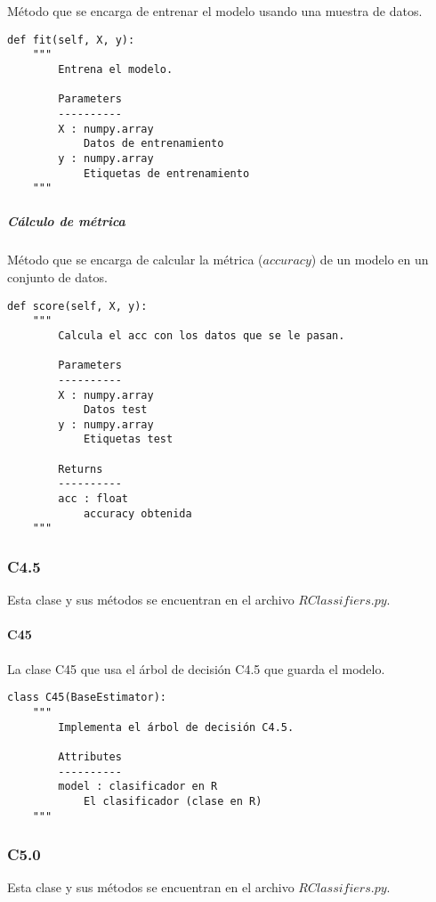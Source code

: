 Método que se encarga de entrenar el modelo usando una muestra de datos.

\begin{lstlisting}
def fit(self, X, y):
    """
        Entrena el modelo.

        Parameters
        ----------
        X : numpy.array
            Datos de entrenamiento
        y : numpy.array
            Etiquetas de entrenamiento
    """
\end{lstlisting}

\subparagraph{Cálculo de métrica}

Método que se encarga de calcular la métrica ($accuracy$) de un modelo en un conjunto de datos.

\begin{lstlisting}
def score(self, X, y):
    """
        Calcula el acc con los datos que se le pasan.

        Parameters
        ----------
        X : numpy.array
            Datos test
        y : numpy.array
            Etiquetas test

        Returns
        ----------
        acc : float
            accuracy obtenida
    """
\end{lstlisting}

\subsubsection{C4.5}

Esta clase y sus métodos se encuentran en el archivo $RClassifiers.py$.

\paragraph{C45}

La clase C45 que usa el árbol de decisión C4.5 que guarda el modelo.

\begin{lstlisting}
class C45(BaseEstimator):
    """
        Implementa el árbol de decisión C4.5.

        Attributes
        ----------
        model : clasificador en R
            El clasificador (clase en R)
    """
\end{lstlisting}

\subsubsection{C5.0}

Esta clase y sus métodos se encuentran en el archivo $RClassifiers.py$.


